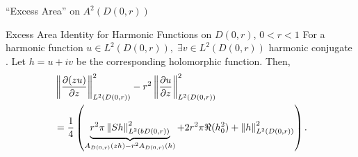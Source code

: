 \documentclass{reu_beamer}
\begin{document}
\begin{frame}{``Excess Area'' on $A^{2}(D(0,r))$}
    \begin{block}{Excess Area Identity for Harmonic Functions on $D(0,r)$, $0 < r < 1$}
    \small
        For a harmonic function $u\in L^2(D(0,r)),\;\exists v\in L^{2}\left(D(0,r)\right)$ harmonic conjugate \cite{bambico2022generalization}. Let $h=u+iv$ be the corresponding holomorphic function. Then, 
        \begin{align*}
            &\left\Vert \frac{\partial (zu)}{\partial z} \right\Vert^2_{L^2(D(0,r))}-r^2\left\Vert \frac{\partial u}{\partial z} \right\Vert^2_{L^2(D(0,r))}\\
            &=\frac{1}{4}\left(\underbrace{r^2\pi\left\Vert Sh \right\Vert_{L^2(b D(0,r))}^2}_{A_{D(0,r)}(zh) - r^2A_{D(0,r)}(h)}+2r^2\pi\Re(h_0^2)+\left\Vert h \right\Vert^2_{L^2(D(0,r))}\right).
        \end{align*}
    \end{block}
\end{frame}
%
\end{document}
